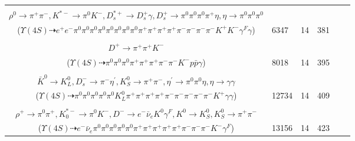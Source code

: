 \documentclass[landscape]{article}
\newcounter{rownumbers}
\newcommand\rn{\stepcounter{rownumbers}\arabic{rownumbers}}
\newcommand{\EOLP}{\\ \hline} %
\newcommand{\topoTags}[1]{#1} %
\begin{document}
\begin{longtable}{clcccc}
\rn & \makecell[l]{ $ 
\Upsilon(4S) \rightarrow B^{0} \bar{B}^{0} ,
B^{0} \rightarrow \pi^{-} K_{0}^{*+} ,
\bar{B}^{0} \rightarrow \pi^{0} \rho^{0} \rho^{0} \pi^{+} \pi^{-} K^{*-} D_{s}^{*+} ,
K_{0}^{*+} \rightarrow \pi^{0} K^{+} ,
\pi^{0} \rightarrow e^{+} e^{-} \gamma^{F} ,
\rho^{0} \rightarrow \pi^{+} \pi^{-} ,
$ \\ $
\rho^{0} \rightarrow \pi^{+} \pi^{-} ,
K^{*-} \rightarrow \pi^{0} K^{-} ,
D_{s}^{*+} \rightarrow D_{s}^{+} \gamma ,
D_{s}^{+} \rightarrow \pi^{0} \pi^{0} \pi^{0} \pi^{+} \eta ,
\eta \rightarrow \pi^{0} \pi^{0} \pi^{0} 
$ \\ ($
\Upsilon(4S) \dashrightarrow e^{+} e^{-} \pi^{0} \pi^{0} \pi^{0} \pi^{0} \pi^{0} \pi^{0} \pi^{0} \pi^{0} \pi^{+} \pi^{+} \pi^{+} \pi^{+} \pi^{-} \pi^{-} \pi^{-} \pi^{-} K^{+} K^{-} \gamma^{F} \gamma 
$) } & \topoTags{6347 & }14 & 381 \EOLP

\rn & \makecell[l]{ $ 
\Upsilon(4S) \rightarrow \bar{B}^{0} \bar{B}^{0} ,
\bar{B}^{0} \rightarrow \pi^{0} \pi^{+} \pi^{-} ,
\bar{B}^{0} \rightarrow \pi^{-} D^{*+} \Sigma^{+} \bar{\Sigma}^{-} ,
D^{*+} \rightarrow D^{+} \gamma ,
\Sigma^{+} \rightarrow \pi^{0} p ,
\bar{\Sigma}^{-} \rightarrow \pi^{0} \bar{p} ,
$ \\ $
D^{+} \rightarrow \pi^{+} \pi^{+} K^{-} 
$ \\ ($
\Upsilon(4S) \dashrightarrow \pi^{0} \pi^{0} \pi^{0} \pi^{+} \pi^{+} \pi^{+} \pi^{-} \pi^{-} K^{-} p \bar{p} \gamma 
$) } & \topoTags{8018 & }14 & 395 \EOLP

\rn & \makecell[l]{ $ 
\Upsilon(4S) \rightarrow B^{0} B^{0} ,
B^{0} \rightarrow \pi^{0} \pi^{+} \pi^{-} ,
B^{0} \rightarrow \pi^{+} \rho^{-} \omega K^{0} \bar{K}^{0} K^{+} D_{s}^{-} ,
\rho^{-} \rightarrow \pi^{0} \pi^{-} ,
\omega \rightarrow \pi^{0} \pi^{+} \pi^{-} ,
K^{0} \rightarrow K_{S}^{0} ,
$ \\ $
\bar{K}^{0} \rightarrow K_{L}^{0} ,
D_{s}^{-} \rightarrow \pi^{-} \eta^{\prime} ,
K_{S}^{0} \rightarrow \pi^{+} \pi^{-} ,
\eta^{\prime} \rightarrow \pi^{0} \pi^{0} \eta ,
\eta \rightarrow \gamma \gamma 
$ \\ ($
\Upsilon(4S) \dashrightarrow \pi^{0} \pi^{0} \pi^{0} \pi^{0} \pi^{0} K_{L}^{0} \pi^{+} \pi^{+} \pi^{+} \pi^{+} \pi^{-} \pi^{-} \pi^{-} \pi^{-} \pi^{-} K^{+} \gamma \gamma 
$) } & \topoTags{12734 & }14 & 409 \EOLP

\rn & \makecell[l]{ $ 
\Upsilon(4S) \rightarrow B^{0} \bar{B}^{0} ,
B^{0} \rightarrow \pi^{0} \rho^{0} \pi^{+} \pi^{-} \rho^{+} D^{*-} ,
\bar{B}^{0} \rightarrow \rho^{+} K_{0}^{*-} ,
\rho^{0} \rightarrow \pi^{+} \pi^{-} ,
\rho^{+} \rightarrow \pi^{0} \pi^{+} ,
D^{*-} \rightarrow \pi^{0} D^{-} ,
$ \\ $
\rho^{+} \rightarrow \pi^{0} \pi^{+} ,
K_{0}^{*-} \rightarrow \pi^{0} K^{-} ,
D^{-} \rightarrow e^{-} \bar{\nu}_{e} K^{0} \gamma^{F} ,
K^{0} \rightarrow K_{S}^{0} ,
K_{S}^{0} \rightarrow \pi^{+} \pi^{-} 
$ \\ ($
\Upsilon(4S) \dashrightarrow e^{-} \bar{\nu}_{e} \pi^{0} \pi^{0} \pi^{0} \pi^{0} \pi^{0} \pi^{+} \pi^{+} \pi^{+} \pi^{+} \pi^{+} \pi^{-} \pi^{-} \pi^{-} K^{-} \gamma^{F} 
$) } & \topoTags{13156 & }14 & 423 \EOLP


\end{longtable}
\end{document}

